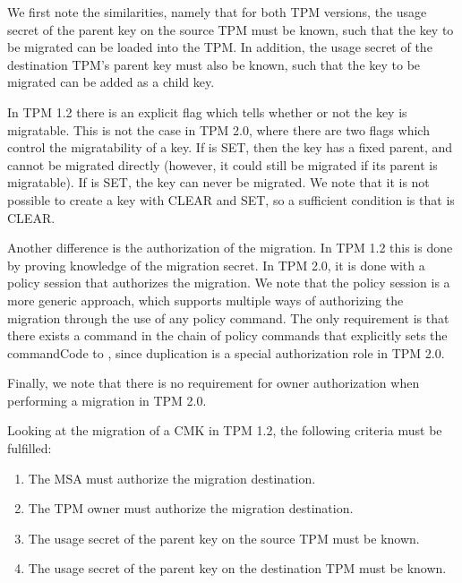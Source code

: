 {We first note the similarities, namely that for both TPM versions, the usage secret of the  parent key on the source TPM must be known, such that the key to be migrated can be loaded into the TPM. In addition, the usage secret of the destination TPM's parent key must also be known, such that the key to be migrated can be added as a child key.

In TPM 1.2 there is an explicit flag which tells whether or not the key is migratable. This is not the case in TPM 2.0, where there are two flags which control the migratability of a key. If  is SET, then the key has a fixed parent, and cannot be migrated directly (however, it could still be migrated if its parent is migratable). If  is SET, the key can never be migrated. We note that it is not possible to create a key with  CLEAR and  SET, so a sufficient condition is that  is CLEAR.

Another difference is the authorization of the migration. In TPM 1.2 this is done by proving knowledge of the migration secret. In TPM 2.0, it is done with a policy session that authorizes the migration. We note that the policy session is a more generic approach, which supports multiple ways of authorizing the migration through the use of any policy command. The only requirement is that there exists a command in the chain of policy commands that explicitly sets the commandCode to , since duplication is a special authorization role in TPM 2.0.


Finally, we note that there is no requirement for owner authorization when performing a migration in TPM 2.0.

Looking at the migration of a CMK in TPM 1.2, the following criteria must be fulfilled:

\begin{enumerate}
	\item The MSA must authorize the migration destination.
	\item The TPM owner must authorize the migration destination.
	\item The usage secret of the parent key on the source TPM must be known.
	\item The usage secret of the parent key on the destination TPM must be known.
\end{enumerate}

}
